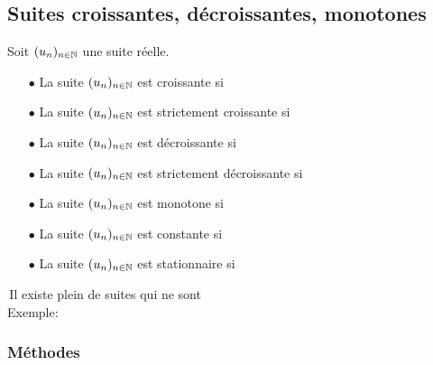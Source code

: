 \documentclass[a4paper, 11pt]{article}
\begin{document}
\subsection{Suites croissantes, d\'ecroissantes, monotones}



\begin{defi} Soit $(u_n)_{n\in \mathbb{N}}$ une suite r\'eelle. 
\begin{itemize}
\item[$\bullet$] La suite $(u_n)_{n\in \mathbb{N}}$ est croissante si \dotfill \vspace{0.3cm}
\item[$\bullet$] La suite $(u_n)_{n\in \mathbb{N}}$ est strictement croissante si \dotfill \vspace{0.3cm}
\item[$\bullet$] La suite $(u_n)_{n\in \mathbb{N}}$ est d\'ecroissante si \dotfill \vspace{0.3cm}
\item[$\bullet$] La suite $(u_n)_{n\in \mathbb{N}}$ est strictement d\'ecroissante si \dotfill \vspace{0.3cm}
\item[$\bullet$] La suite $(u_n)_{n\in \mathbb{N}}$ est monotone si \dotfill \vspace{0.3cm}
\item[$\bullet$] La suite $(u_n)_{n\in \mathbb{N}}$ est constante si \dotfill \vspace{0.3cm}
\item[$\bullet$] La suite $(u_n)_{n\in \mathbb{N}}$ est stationnaire si \dotfill \vspace{0.3cm}
\end{itemize}
\end{defi}

\warning \,Il existe plein de suites qui ne sont \dotfill \\
 Exemple: \dotfill

\vspace{0.4cm}
\subsubsection{M\'ethodes}%
\end{document}
